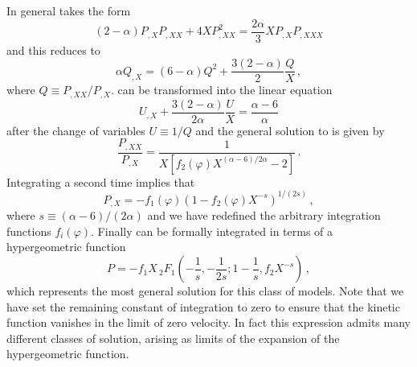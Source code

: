 In general  takes the form 
% 
\begin{equation}
\label{eq:genPXeqn-multi}
(2-\alpha ) P_{,X}P_{,XX} + 4XP^2_{,XX} = \frac{2\alpha }{3}
X P_{,X}P_{,XXX}
\end{equation}
% 
and this reduces to 
% 
\begin{equation}
\label{eq:genreduce-multi}
\alpha Q_{,X} = (6-\alpha ) Q^2 + \frac{3(2-\alpha )}{2} \frac{Q}{X} \, ,
\end{equation}
% 
where $Q \equiv P_{,XX}/P_{,X}$. 
 can be transformed into the 
linear equation
% 
\begin{equation}
\label{eq:lineargen-multi}
U_{,X}+ \frac{3(2-\alpha )}{2\alpha} \frac{U}{X} = \frac{\alpha -6}{\alpha}
\end{equation}
% 
after the change of variables $U \equiv 1/Q$
and the general solution to  is given by
%  
\begin{equation}
\label{eq:gensolnlinear-multi}
\frac{P_{,XX}}{P_{,X}} = \frac{1}{X\left[ f_2(\varphi) X^{(\alpha -6)/2\alpha}
-2 \right] } \, .
\end{equation}
% 
Integrating a second time implies that
% 
\begin{equation}
\label{eq:secondint-multi}
P_{,X} = -f_1 (\varphi ) \left( 1- f_2(\varphi ) X^{-s} \right)^{1/(2s)}  \, ,
\end{equation}
% 
where $s \equiv (\alpha -6 )/(2 \alpha)$ and we have redefined 
the arbitrary integration functions $f_i(\varphi )$.  
Finally  can be formally integrated 
in terms of a hypergeometric function
%  
\begin{equation}
 \label{eq:thirdint-multi}
 P= -f_1X \,{_2}F_1 \left( -\frac{1}{s}, -\frac{1}{2s}; 1-\frac{1}{s}, f_2X^{-s}
\right)  \, ,
\end{equation}
%  
which represents the most general solution for this class of models. 
Note that we have set the
remaining constant of integration to zero to ensure 
that the kinetic function vanishes in the limit of
zero velocity. In fact this expression admits many 
different classes of solution, arising as limits
of the expansion of the hypergeometric function.



